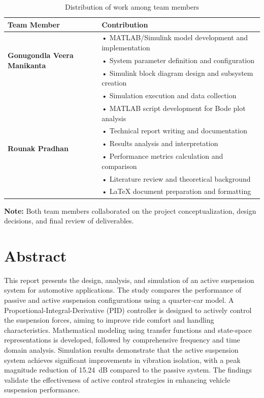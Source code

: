 \documentclass[12pt,a4paper]{article}
\begin{document}
\begin{table}[H]
\centering
\begin{tabular}{|l|p{10cm}|}
\hline
\textbf{Team Member} & \textbf{Contribution} \\ \hline
\multirow{3}{*}{\textbf{Gonugondla Veera Manikanta}} 
& \vspace{2pt}• MATLAB/Simulink model development and implementation \\ 
& • System parameter definition and configuration \\
& • Simulink block diagram design and subsystem creation \\
& • Simulation execution and data collection \\
& • MATLAB script development for Bode plot analysis \\ \hline
\multirow{3}{*}{\textbf{Rounak Pradhan}} 
& \vspace{2pt}• Technical report writing and documentation \\ 
& • Results analysis and interpretation \\
& • Performance metrics calculation and comparison \\
& • Literature review and theoretical background \\
& • LaTeX document preparation and formatting \\ \hline
\end{tabular}
\caption{Distribution of work among team members}
\end{table}

\textbf{Note:} Both team members collaborated on the project conceptualization, design decisions, and final review of deliverables.

\newpage
\section*{Abstract}

This report presents the design, analysis, and simulation of an active suspension system for automotive applications. The study compares the performance of passive and active suspension configurations using a quarter-car model. A Proportional-Integral-Derivative (PID) controller is designed to actively control the suspension forces, aiming to improve ride comfort and handling characteristics. Mathematical modeling using transfer functions and state-space representations is developed, followed by comprehensive frequency and time domain analysis. Simulation results demonstrate that the active suspension system achieves significant improvements in vibration isolation, with a peak magnitude reduction of \SI{15.24}{dB} compared to the passive system. The findings validate the effectiveness of active control strategies in enhancing vehicle suspension performance.
\end{document}
